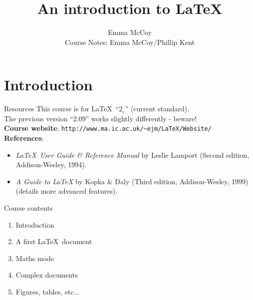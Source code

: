 \documentclass[handout]{beamer}
\title{An introduction to \LaTeX}
\author[Emma McCoy]{Emma McCoy\\Course Notes: Emma McCoy/Phillip Kent}
\begin{document}
					
\begin{frame}
\maketitle
\end{frame}

\section{Introduction}
\begin{frame}[fragile]{Resources}
This course is for \LaTeX\  ``$2_\varepsilon$'' (current standard).\\
The previous version ``2.09'' works slightly differently - beware!\\[0.5cm]
\textbf{Course website}:
\verb|http://www.ma.ic.ac.uk/~ejm/LaTeX/Website/|\\[0.5cm]
\textbf{References}: 
\begin{itemize}
\item {\em \LaTeX\ User Guide \&
Reference Manual} by Leslie Lamport (Second edition, Addison-Wesley,  1994).
\item {\em A Guide to \LaTeX}  by Kopka \& Daly (Third edition,
Addison-Wesley, 1999) (details more advanced features).
\end{itemize}
\end{frame}

\begin{frame}{Course contents}
\begin{enumerate}
\item Introduction \pause
\item A first \LaTeX\ document \pause
\item Maths mode \pause
\item Complex documents \pause
\item Figures, tables, etc...
\end{enumerate}
\end{frame}
\end{document}
